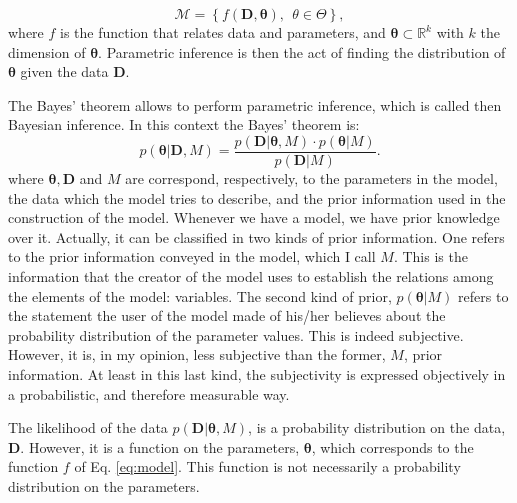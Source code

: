 \begin{equation}
\label{eq:model}
\mathcal{M}=\left\{ f(\mathbf{D}, \mathbf{\theta}), \ \ \theta \in \Theta\right\},
\end{equation}
 where $f$ is the function that relates data and parameters, and $\mathbf{\theta} \subset \mathbb{R}^k$  with $k$ the dimension of $\mathbf{\theta}$.
Parametric inference is then the act of finding the distribution of $\mathbf{\theta}$ given the data $\mathbf{D}$.
 
The Bayes' theorem allows to perform parametric inference, which is called then Bayesian inference. In this context the Bayes'  theorem is:
\begin{equation}
p(\mathbf{\theta}|\mathbf{D},M) = \frac{p(\mathbf{D}|\mathbf{\theta},M)\cdot p(\mathbf{\theta}|M)}{p(\mathbf{D}|M)}.
\end{equation}
where $\mathbf{\theta},\mathbf{D}$ and $M$ are correspond, respectively, to the parameters in the model, the data which the model tries to describe, and the prior information used in the construction of the model. 
Whenever we have a model, we have prior knowledge over it. Actually, it can be classified in two kinds of prior information. One refers to the prior information conveyed in the model, which I call $M$. This is the information that the creator of the model uses to establish the relations among the elements of the model: variables. The second kind of prior, $p(\mathbf{\theta}|M)$ refers to the statement the user of the model made of his/her believes about the probability distribution of the parameter values. This is indeed subjective. However, it is, in my opinion, less subjective than the former, $M$, prior information. At least in this last kind, the subjectivity is expressed objectively in a probabilistic, and therefore measurable way.

The likelihood of the data $p(\mathbf{D}|\mathbf{\theta},M)$, is a probability distribution on the data, $\mathbf{D}$. However, it is a function on the parameters, $\mathbf{\theta}$, which corresponds to the function $f$ of Eq. \ref{eq:model}. This function is not necessarily a probability distribution on the parameters. 

